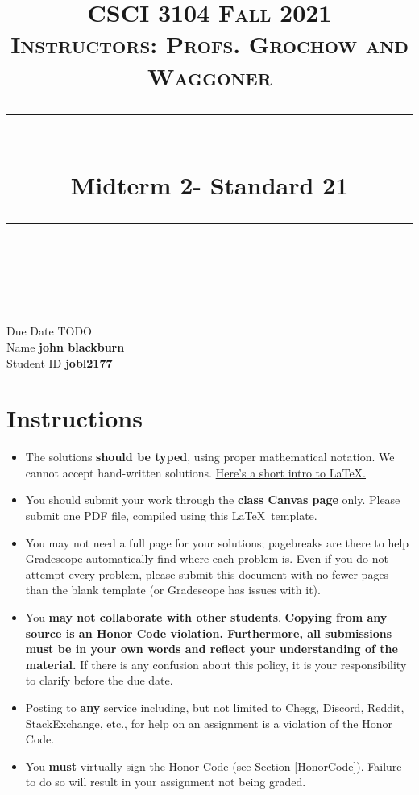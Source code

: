 \documentclass[11pt]{article}
\title{
\normalfont \normalsize 
\textsc{CSCI 3104 Fall 2021 \\ 
Instructors: Profs. Grochow and Waggoner} \\
[10pt] 
\rule{\linewidth}{0.5pt} \\[6pt] 
\huge Midterm 2- Standard 21 \\
\rule{\linewidth}{2pt}  \\[10pt]
}
\date{}
\theoremstyle{definition}
\theoremstyle{definition}
\theoremstyle{definition}
\begin{document}

\maketitle


\noindent
Due Date \dotfill TODO \\
Name \dotfill \textbf{john blackburn} \\
Student ID \dotfill \textbf{jobl2177} \\


\tableofcontents

\section{Instructions}
 \begin{itemize}
	\item The solutions \textbf{should be typed}, using proper mathematical notation. We cannot accept hand-written solutions. \href{http://ece.uprm.edu/~caceros/latex/introduction.pdf}{Here's a short intro to \LaTeX.}
	\item You should submit your work through the \textbf{class Canvas page} only. Please submit one PDF file, compiled using this \LaTeX \ template.
	\item You may not need a full page for your solutions; pagebreaks are there to help Gradescope automatically find where each problem is. Even if you do not attempt every problem, please submit this document with no fewer pages than the blank template (or Gradescope has issues with it).

	\item You \textbf{may not collaborate with other students}. \textbf{Copying from any source is an Honor Code violation. Furthermore, all submissions must be in your own words and reflect your understanding of the material.} If there is any confusion about this policy, it is your responsibility to clarify before the due date. 

	\item Posting to \textbf{any} service including, but not limited to Chegg, Discord, Reddit, StackExchange, etc., for help on an assignment is a violation of the Honor Code.

	\item You \textbf{must} virtually sign the Honor Code (see Section \ref{HonorCode}). Failure to do so will result in your assignment not being graded.
\end{itemize}
\end{document}
